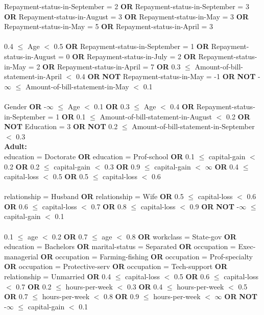 \noindent Repayment-status-in-September = 2 \textbf{OR} Repayment-status-in-September = 3 \textbf{OR} Repayment-status-in-August = 3 \textbf{OR} Repayment-status-in-May = 3 \textbf{OR} Repayment-status-in-May = 5 \textbf{OR} Repayment-status-in-April = 3 \\\\0.4 $\le$ Age $<$ 0.5 \textbf{OR} Repayment-status-in-September = 1 \textbf{OR} Repayment-status-in-August = 0 \textbf{OR} Repayment-status-in-July = 2 \textbf{OR} Repayment-status-in-May = 2 \textbf{OR} Repayment-status-in-April = 7 \textbf{OR} 0.3 $\le$ Amount-of-bill-statement-in-April $<$ 0.4 \textbf{OR}  \textbf{NOT} Repayment-status-in-May = -1 \textbf{OR}  \textbf{NOT} -$\infty$ $\le$ Amount-of-bill-statement-in-May $<$ 0.1 \\\\Gender \textbf{OR} -$\infty$ $\le$ Age $<$ 0.1 \textbf{OR} 0.3 $\le$ Age $<$ 0.4 \textbf{OR} Repayment-status-in-September = 1 \textbf{OR} 0.1 $\le$ Amount-of-bill-statement-in-August $<$ 0.2 \textbf{OR}  \textbf{NOT} Education = 3 \textbf{OR}  \textbf{NOT} 0.2 $\le$ Amount-of-bill-statement-in-September $<$ 0.3 \\

\noindent \textbf{ Adult: }\\

\noindent education =  Doctorate \textbf{OR} education =  Prof-school \textbf{OR} 0.1 $\le$ capital-gain $<$ 0.2 \textbf{OR} 0.2 $\le$ capital-gain $<$ 0.3 \textbf{OR} 0.9 $\le$ capital-gain $<$ $\infty$ \textbf{OR} 0.4 $\le$ capital-loss $<$ 0.5 \textbf{OR} 0.5 $\le$ capital-loss $<$ 0.6 \\\\relationship =  Husband \textbf{OR} relationship =  Wife \textbf{OR} 0.5 $\le$ capital-loss $<$ 0.6 \textbf{OR} 0.6 $\le$ capital-loss $<$ 0.7 \textbf{OR} 0.8 $\le$ capital-loss $<$ 0.9 \textbf{OR}  \textbf{NOT} -$\infty$ $\le$ capital-gain $<$ 0.1 \\\\0.1 $\le$ age $<$ 0.2 \textbf{OR} 0.7 $\le$ age $<$ 0.8 \textbf{OR} workclass =  State-gov \textbf{OR} education =  Bachelors \textbf{OR} marital-status =  Separated \textbf{OR} occupation =  Exec-managerial \textbf{OR} occupation =  Farming-fishing \textbf{OR} occupation =  Prof-specialty \textbf{OR} occupation =  Protective-serv \textbf{OR} occupation =  Tech-support \textbf{OR} relationship =  Unmarried \textbf{OR} 0.4 $\le$ capital-loss $<$ 0.5 \textbf{OR} 0.6 $\le$ capital-loss $<$ 0.7 \textbf{OR} 0.2 $\le$ hours-per-week $<$ 0.3 \textbf{OR} 0.4 $\le$ hours-per-week $<$ 0.5 \textbf{OR} 0.7 $\le$ hours-per-week $<$ 0.8 \textbf{OR} 0.9 $\le$ hours-per-week $<$ $\infty$ \textbf{OR}  \textbf{NOT} -$\infty$ $\le$ capital-gain $<$ 0.1 \\

